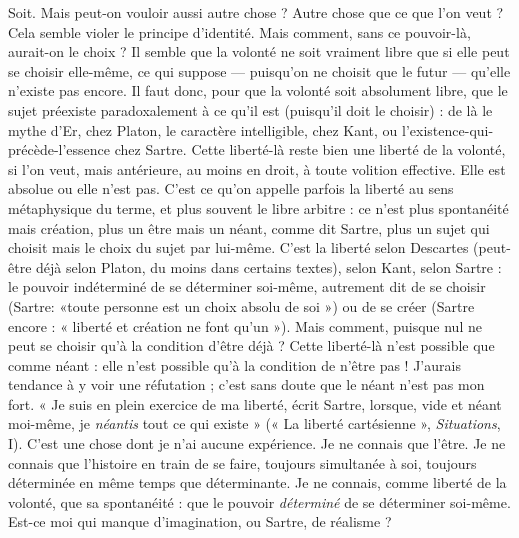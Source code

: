 {Soit. Mais peut-on vouloir aussi autre chose ? Autre chose que ce que l’on
veut ? Cela semble violer le principe d’identité. Mais comment, sans ce pouvoir-là,
aurait-on le choix ? Il semble que la volonté ne soit vraiment libre que
si elle peut se choisir elle-même, ce qui suppose — puisqu'on ne choisit que le
futur — qu’elle n’existe pas encore. Il faut donc, pour que la volonté soit absolument
libre, que le sujet préexiste paradoxalement à ce qu’il est (puisqu'il doit
le choisir) : de là le mythe d’Er, chez Platon, le caractère intelligible, chez Kant,
ou l’existence-qui-précède-l’essence chez Sartre. Cette liberté-là reste bien une
liberté de la volonté, si l’on veut, mais antérieure, au moins en droit, à toute
volition effective. Elle est absolue ou elle n’est pas. C’est ce qu’on appelle parfois
la liberté au sens métaphysique du terme, et plus souvent le libre arbitre :
ce n’est plus spontanéité mais création, plus un être mais un néant, comme dit
Sartre, plus un sujet qui choisit mais le choix du sujet par lui-même. C’est la
liberté selon Descartes (peut-être déjà selon Platon, du moins dans certains
textes), selon Kant, selon Sartre : le pouvoir indéterminé de se déterminer soi-même,
autrement dit de se choisir (Sartre: «toute personne est un choix
absolu de soi ») ou de se créer (Sartre encore : « liberté et création ne font
qu’un »). Mais comment, puisque nul ne peut se choisir qu’à la condition
d’être déjà ? Cette liberté-là n’est possible que comme néant : elle n’est possible
qu’à la condition de n’être pas ! J'aurais tendance à y voir une réfutation ; c’est
sans doute que le néant n’est pas mon fort. « Je suis en plein exercice de ma
liberté, écrit Sartre, lorsque, vide et néant moi-même, je {\it néantis} tout ce qui
existe » (« La liberté cartésienne », {\it Situations}, I). C’est une chose dont je n’ai
aucune expérience. Je ne connais que l'être. Je ne connais que l’histoire en train
de se faire, toujours simultanée à soi, toujours déterminée en même temps que
déterminante. Je ne connais, comme liberté de la volonté, que sa spontanéité :
que le pouvoir {\it déterminé} de se déterminer soi-même. Est-ce moi qui manque
d'imagination, ou Sartre, de réalisme ?

}

